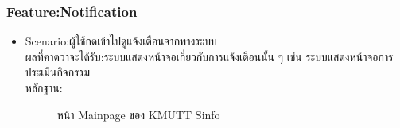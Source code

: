 \documentclass[14pt,oneside,openright,a4paper]{cpe-thai-project}
\begin{document}
\subsubsection{Feature:Notification}
\begin{itemize}
  \item Scenario:ผู้ใช้กดเข้าไปดูแจ้งเตือนจากทางระบบ\\ผลที่คาดว่าจะได้รับ:ระบบแสดงหน้าจอเกี่ยวกับการแจ้งเตือนนั้น ๆ เช่น ระบบแสดงหน้าจอการประเมินกิจกรรม\\หลักฐาน:\\
  \begin{figure}[!h]\centering
    \setlength{\fboxrule}{0.5mm} %
    \setlength{\fboxsep}{0.5cm}
    \caption{หน้า Mainpage ของ KMUTT Sinfo}\label{fig:sinfo}
  \end{figure}
\end{itemize}
\newpage
\end{document}
